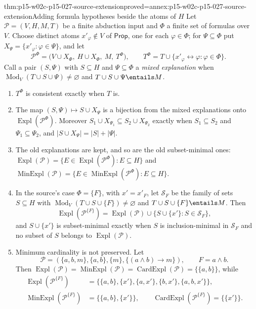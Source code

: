 \begin{hbtheorem}{thm:p15-w02c-p15-027-source-extension}{proved=annex:p15-w02c-p15-027-source-extension}{Adding formula hypotheses beside the atoms of \texorpdfstring{\(H\)}{H}}
Let \(\mathcal P=(V,H,M,T)\) be a finite abduction input and \(\Phi\) a
finite set of formulas over \(V\). Choose distinct atoms
\(x'_\varphi\notin V\) of \(\mathsf{Prop}\), one for each
\(\varphi\in\Phi\); for \(\Psi\subseteq\Phi\) put
\(X_\Psi=\{x'_\varphi:\varphi\in\Psi\}\), and let
\[
 \mathcal P^{\Phi}=\bigl(V\cup X_\Phi,\ H\cup X_\Phi,\ M,\
   T^{\Phi}\bigr),\qquad
 T^{\Phi}=T\cup\{x'_\varphi\leftrightarrow\varphi:\varphi\in\Phi\}.
\]
Call a pair \((S,\Psi)\) with \(S\subseteq H\) and \(\Psi\subseteq\Phi\) a
\emph{mixed explanation} when
\(\operatorname{Mod}_V(T\cup S\cup\Psi)\ne\varnothing\) and
\(T\cup S\cup\Psi\entails M\).
\begin{enumerate}
\item \(T^{\Phi}\) is consistent exactly when \(T\) is.
\item The map \((S,\Psi)\mapsto S\cup X_\Psi\) is a bijection from the
      mixed explanations onto \(\operatorname{Expl}(\mathcal P^{\Phi})\).
      Moreover \(S_1\cup X_{\Psi_1}\subseteq S_2\cup X_{\Psi_2}\) exactly
      when \(S_1\subseteq S_2\) and \(\Psi_1\subseteq\Psi_2\), and
      \(|S\cup X_\Psi|=|S|+|\Psi|\).
\item The old explanations are kept, and so are the old subset-minimal
      ones:
      \(\operatorname{Expl}(\mathcal P)=\{E\in\operatorname{Expl}(\mathcal P^{\Phi}):E\subseteq H\}\)
      and
      \(\operatorname{MinExpl}(\mathcal P)=\{E\in\operatorname{MinExpl}(\mathcal P^{\Phi}):E\subseteq H\}\).
\item In the source's case \(\Phi=\{F\}\), with \(x'=x'_F\), let
      \(\mathcal S_F\) be the family of sets \(S\subseteq H\) with
      \(\operatorname{Mod}_V(T\cup S\cup\{F\})\ne\varnothing\) and
      \(T\cup S\cup\{F\}\entails M\). Then
      \[
       \operatorname{Expl}(\mathcal P^{\{F\}})
        =\operatorname{Expl}(\mathcal P)\cup
         \{S\cup\{x'\}:S\in\mathcal S_F\},
      \]
      and \(S\cup\{x'\}\) is subset-minimal exactly when \(S\) is
      inclusion-minimal in \(\mathcal S_F\) and no subset of \(S\)
      belongs to \(\operatorname{Expl}(\mathcal P)\).
\item Minimum cardinality is not preserved. Let
      \[
       \mathcal P=(\{a,b,m\},\{a,b\},\{m\},\{(a\land b)\to m\}),
       \qquad F=a\land b.
      \]
      Then
      \(\operatorname{Expl}(\mathcal P)=\operatorname{MinExpl}(\mathcal P)
        =\operatorname{CardExpl}(\mathcal P)=\{\{a,b\}\}\), while
      \[
      \begin{aligned}
       \operatorname{Expl}(\mathcal P^{\{F\}})
        &=\{\{a,b\},\{x'\},\{a,x'\},\{b,x'\},\{a,b,x'\}\},\\
       \operatorname{MinExpl}(\mathcal P^{\{F\}})&=\{\{a,b\},\{x'\}\},\qquad
       \operatorname{CardExpl}(\mathcal P^{\{F\}})=\{\{x'\}\}.
      \end{aligned}
      \]
\end{enumerate}
\end{hbtheorem}

